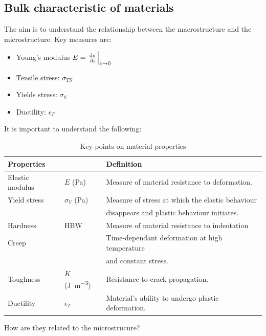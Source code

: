 \subsection{Bulk characteristic of materials}
The aim is to understand the relationship between the macrostructure and the microstructure. Key measures are:
\begin{itemize}
	\item Young's modulus $E = \left. \frac{\dif \sigma}{\dif \varepsilon} \right|_{\varepsilon \rightarrow 0}$
	\item Tensile stress: $\sigma_{TS}$
	\item Yields stress: $\sigma_{Y}$
	\item Ductility: $\epsilon_{T}$
\end{itemize}
It is important to understand the following:
\begin{table}
	\centering
	\begin{tabular}{@{}lll@{}}
		\toprule
		\textbf{Properties} & &\textbf{Definition}\\
		\midrule
		Elastic modulus & $E$ (\si{\pascal}) & Measure of material resistance to deformation.\\
		Yield stress & $\sigma_Y$ (\si{\pascal}) & Measure of stress at which the elastic behaviour\\
		& & disappears and plastic behaviour initiates.\\
		Hardness & HBW & Measure of material resistance to indentation\\
		Creep & & Time-dependant deformation at high temperature\\
		& & and constant stress.\\
		Toughness & $K$ (\si{\joule\per\meter\cubed}) & Resistance to crack propagation.\\
		Ductility & $\epsilon_T$ & Material's ability to undergo plastic deformation.\\
		\bottomrule
	\end{tabular}
	\caption{Key points on material properties}
\end{table}
How are they related to the microstrucure? 
